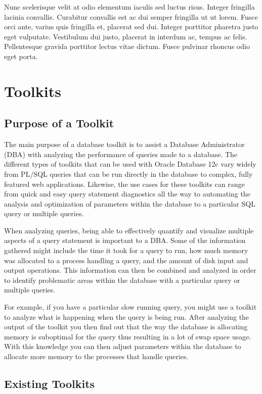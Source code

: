 \documentclass[draftclsnofoot, onecolumn, compsoc, 10pt]{IEEEtran}
\begin{document}
Nunc scelerisque velit at odio elementum iaculis sed luctus risus. Integer fringilla lacinia convallis. Curabitur convallis est ac dui semper fringilla ut ut lorem. Fusce orci ante, varius quis fringilla et, placerat sed dui. Integer porttitor pharetra justo eget vulputate. Vestibulum dui justo, placerat in interdum ac, tempus ac felis. Pellentesque gravida porttitor lectus vitae dictum. Fusce pulvinar rhoncus odio eget porta.

\section{Toolkits}
\subsection{Purpose of a Toolkit}
The main purpose of a database toolkit is to assist a Database Administrator (DBA) with analyzing the performance of queries made to a database. 
The different types of toolkits that can be used with Oracle Database 12c vary widely from PL/SQL queries that can be run directly in the database to complex, fully featured web applications. 
Likewise, the use cases for these toolkits can range from quick and easy query statement diagnostics all the way to automating the analysis and optimization of parameters within the database to a particular SQL query or multiple queries. 

When analyzing queries, being able to effectively quantify and visualize multiple aspects of a query statement is important to a DBA. 
Some of the information gathered might include the time it took for a query to run, how much memory was allocated to a process handling a query, and the amount of disk input and output operations. 
This information can then be combined and analyzed in order to identify problematic areas within the database with a particular query or multiple queries. 

For example, if you have a particular slow running query, you might use a toolkit to analyze what is happening when the query is being run. 
After analyzing the output of the toolkit you then find out that the way the database is allocating memory is suboptimal for the query thus resulting in a lot of swap space usage.
With this knowledge you can then adjust parameters within the database to allocate more memory to the processes that handle queries.

\subsection{Existing Toolkits}
\end{document}

